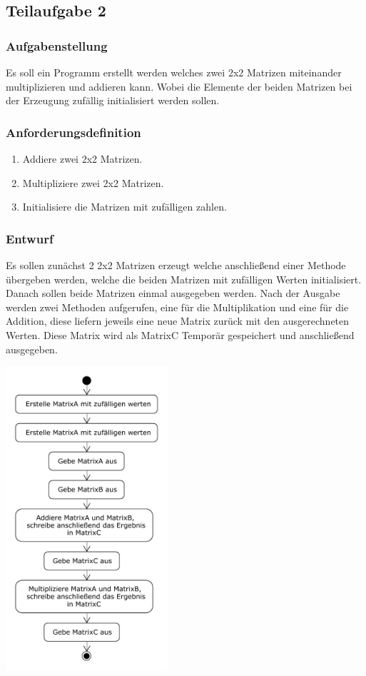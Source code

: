 \subsection{Teilaufgabe 2}
\subsubsection{Aufgabenstellung}
Es soll ein Programm erstellt werden welches zwei 2x2 Matrizen miteinander multiplizieren und addieren
kann. Wobei die Elemente der beiden Matrizen bei der Erzeugung zufällig initialisiert werden sollen. 

\subsubsection{Anforderungsdefinition}
\begin{enumerate}
	\item Addiere zwei 2x2 Matrizen.
	\item Multipliziere zwei 2x2 Matrizen.
	\item Initialisiere die Matrizen mit zufälligen zahlen.
\end{enumerate}

\subsubsection{Entwurf}
Es sollen zunächst 2 2x2 Matrizen erzeugt welche anschlie\ss end einer Methode übergeben werden,
welche die beiden Matrizen mit zufälligen Werten initialisiert. Danach sollen beide Matrizen einmal
ausgegeben werden. Nach der Ausgabe werden zwei Methoden aufgerufen, eine für die Multiplikation
und eine für die Addition, diese liefern jeweils eine neue Matrix zurück mit den ausgerechneten Werten.
Diese Matrix wird als MatrixC Temporär gespeichert und anschlie\ss end ausgegeben.
\begin{center}
	\includegraphics[width=0.45\textwidth]{uml/uml_c4_p2.pdf}
\end{center}

